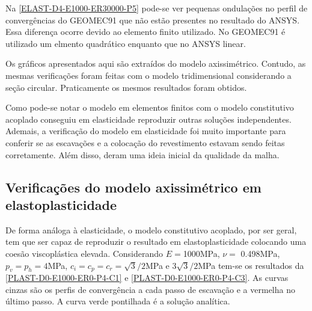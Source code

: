 Na \autoref{ELAST-D4-E1000-ER30000-P5} pode-se ver pequenas ondulações no perfil de convergências do GEOMEC91 que não estão presentes no resultado do ANSYS. Essa diferença ocorre devido ao elemento finito utilizado. No GEOMEC91 é utilizado um elmento quadrático enquanto que no ANSYS linear.

Os gráficos apresentados aqui são extraídos do modelo axissimétrico. Contudo, as mesmas verificações foram feitas com o modelo tridimensional considerando a seção circular. Praticamente os mesmos resultados foram obtidos.

Como pode-se notar o modelo em elementos finitos com o modelo constitutivo acoplado conseguiu em elasticidade reproduzir outras soluções independentes. Ademais, a verificação do modelo em elasticidade foi muito importante para conferir se as escavações e a colocação do revestimento estavam sendo feitas corretamente. Além disso, deram uma ideia inicial da qualidade da malha.

\subsection{Verificações do modelo axissimétrico em elastoplasticidade}

De forma análoga à elasticidade, o modelo constitutivo acoplado, por ser geral, tem que ser capaz de reproduzir o resultado em elastoplasticidade colocando uma coesão viscoplástica elevada. Considerando $E =$1000MPa, $\nu =$ 0.498MPa, $p_v = p_h = 4$MPa, $c_i=c_p=c_r = \sqrt{3}/2$MPa e $3\sqrt{3}/2$MPa  tem-se os resultados da \autoref{PLAST-D0-E1000-ER0-P4-C1} e \autoref{PLAST-D0-E1000-ER0-P4-C3}. As curvas cinzas são os perfis de convergência a cada passo de escavação e a vermelha no último passo. A curva verde pontilhada é a solução analítica.

